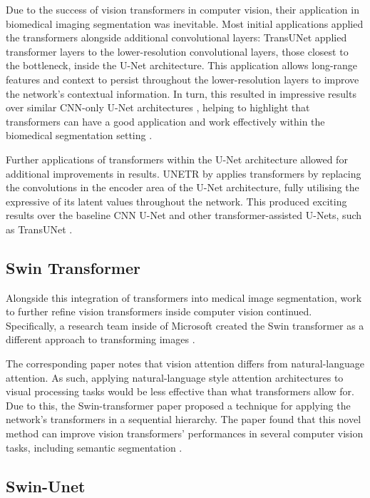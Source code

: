 \documentclass{l4proj}
\begin{document}
Due to the success of vision transformers in computer vision, their application in biomedical imaging segmentation was inevitable. Most initial applications applied the transformers alongside additional convolutional layers: TransUNet applied transformer layers to the lower-resolution convolutional layers, those closest to the bottleneck, inside the U-Net architecture. This application allows long-range features and context to persist throughout the lower-resolution layers to improve the network’s contextual information. In turn, this resulted in impressive results over similar CNN-only U-Net architectures \citep{chen2021transunet}, helping to highlight that transformers can have a good application and work effectively within the biomedical segmentation setting \citep{huang2021missformer}.

Further applications of transformers within the U-Net architecture allowed for additional improvements in results. UNETR by \cite{hatamizadeh2022unetr} applies transformers by replacing the convolutions in the encoder area of the U-Net architecture, fully utilising the expressive of its latent values throughout the network. This produced exciting results over the baseline CNN U-Net and other transformer-assisted U-Nets, such as TransUNet \citep{hatamizadeh2022unetr}.

	\subsection{Swin Transformer}

Alongside this integration of transformers into medical image segmentation, work to further refine vision transformers inside computer vision continued. Specifically, a research team inside of Microsoft created the Swin transformer as a different approach to transforming images \citep{liu2021swin}.

The corresponding paper notes that vision attention differs from natural-language attention. As such, applying natural-language style attention architectures to visual processing tasks would be less effective than what transformers allow for. Due to this, the Swin-transformer paper proposed a technique for applying the network’s transformers in a sequential hierarchy. The paper found that this novel method can improve vision transformers’ performances in several computer vision tasks, including semantic segmentation \citep{liu2021swin}.

	\subsection{Swin-Unet} \label{sec:swin_unet}
\end{document}
